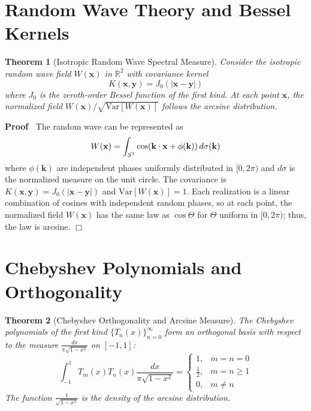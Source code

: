 \documentclass{article}
\newenvironment{proof}{\noindent\textbf{Proof\ }}{\hspace*{\fill}$\Box$\medskip}
\newtheorem{theorem}{Theorem}
\begin{document}
\section{Random Wave Theory and Bessel Kernels}

\begin{theorem}
  [Isotropic Random Wave Spectral Measure] Consider the isotropic random wave
  field $W (\mathbf{x})$ in $\mathbb{R}^2$ with covariance kernel
  \begin{equation}
    K (\mathbf{x}, \mathbf{y}) = J_0 (| \mathbf{x} - \mathbf{y} |)
  \end{equation}
  where $J_0$ is the zeroth-order Bessel function of the first kind. At each
  point $\mathbf{x}$, the normalized field $W (\mathbf{x}) /
  \sqrt{\mathrm{Var} [W (\mathbf{x})]}$ follows the arcsine distribution.
\end{theorem}

\begin{proof}
  The random wave can be represented as
  \begin{equation}
    W (\mathbf{x}) = \int_{S^1} \cos (\mathbf{k} \cdot \mathbf{x} + \phi
    (\mathbf{k}))  \hspace{0.17em} d \sigma (\mathbf{k})
  \end{equation}
  where $\phi (\mathbf{k})$ are independent phases uniformly distributed in
  $[0, 2 \pi)$ and $d \sigma$ is the normalized measure on the unit circle.
  The covariance is $K (\mathbf{x}, \mathbf{y}) = J_0 (| \mathbf{x} -
  \mathbf{y} |)$ and $\mathrm{Var} [W (\mathbf{x})] = 1$. Each realization is
  a linear combination of cosines with independent random phases, so at each
  point, the normalized field $W (\mathbf{x})$ has the same law as $\cos
  \Theta$ for $\Theta$ uniform in $[0, 2 \pi)$; thus, the law is arcsine.
\end{proof}

\section{Chebyshev Polynomials and Orthogonality}

\begin{theorem}
  [Chebyshev Orthogonality and Arcsine Measure] The Chebyshev polynomials of
  the first kind $\{T_n (x)\}_{n = 0}^{\infty}$ form an orthogonal basis with
  respect to the measure $\frac{dx}{\pi \sqrt{1 - x^2}}$ on $[- 1, 1]$:
  \begin{equation}
    \int_{- 1}^1 T_m (x) T_n (x) \frac{dx}{\pi \sqrt{1 - x^2}} =
    \left\{\begin{array}{ll}
      1, & m = n = 0\\
      \frac{1}{2}, & m = n \geq 1\\
      0, & m \neq n
    \end{array}\right.
  \end{equation}
  The function $\frac{1}{\sqrt{1 - x^2}}$ is the density of the arcsine
  distribution.
\end{theorem}
\end{document}
